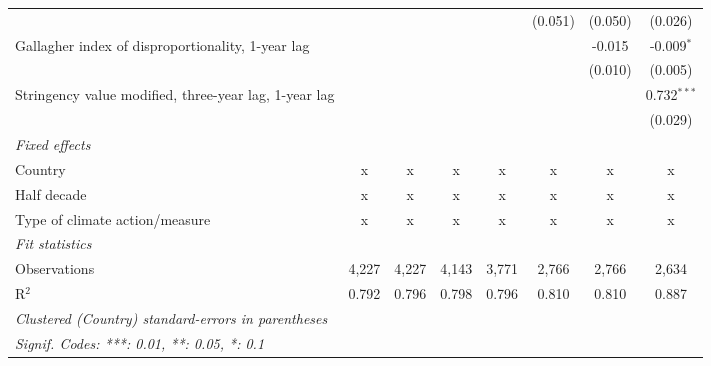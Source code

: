\begin{table}[htbp]
\begin{tabular}{lccccccc}
                                                            &               &               &              &                & (0.051)        & (0.050)        & (0.026)\\   
      Gallagher index of disproportionality, 1-year lag     &               &               &              &                &                & -0.015         & -0.009$^{*}$\\   
                                                            &               &               &              &                &                & (0.010)        & (0.005)\\   
      Stringency value modified, three-year lag, 1-year lag &               &               &              &                &                &                & 0.732$^{***}$\\   
                                                            &               &               &              &                &                &                & (0.029)\\   
      \emph{Fixed effects}\\
      Country                                               & x             & x             & x            & x              & x              & x              & x\\  
      Half decade                                           & x             & x             & x            & x              & x              & x              & x\\  
      Type of climate action/measure                        & x             & x             & x            & x              & x              & x              & x\\  
      \midrule \emph{Fit statistics}\\
      Observations                                          & 4,227         & 4,227         & 4,143        & 3,771          & 2,766          & 2,766          & 2,634\\  
      R$^2$                                                 & 0.792         & 0.796         & 0.798        & 0.796          & 0.810          & 0.810          & 0.887\\  
      \midrule
      \multicolumn{8}{l}{\emph{Clustered (Country) standard-errors in parentheses}}\\
      \multicolumn{8}{l}{\emph{Signif. Codes: ***: 0.01, **: 0.05, *: 0.1}}\\
   \end{tabular}
\end{table}


